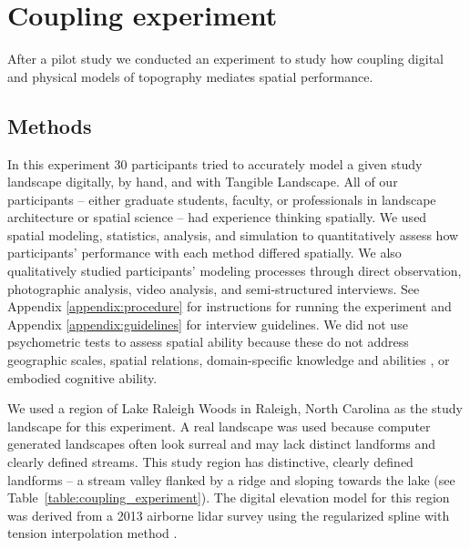 \documentclass[prodmode,acmtochi]{acmsmall} %
\begin{document}
\section{Coupling experiment}
After a pilot study \cite{Harmon2016b}
we conducted an experiment to study how 
coupling digital and physical models of topography 
mediates spatial performance. 

\subsection{Methods}
In this experiment 
30 participants tried to accurately model a given study landscape 
digitally, by hand, and with Tangible Landscape. 
%
All of our participants -- either graduate students, faculty, or professionals in landscape architecture or spatial science -- 
had experience thinking spatially. 
We used spatial modeling, statistics, analysis, and simulation to quantitatively assess how participants' performance with each method differed spatially. 
We also qualitatively studied participants' modeling processes through direct observation, photographic analysis, video analysis, and semi-structured interviews. 
See Appendix 
\ref{appendix:procedure} for instructions for running the experiment
and Appendix 
\ref{appendix:guidelines} for interview guidelines. 
%
We did not use psychometric tests
to assess spatial ability because
these do not address 
geographic scales,
spatial relations,
domain-specific knowledge and abilities 
\cite{Lee2009,Bednarz2011,Wakabayashi2011},
or embodied cognitive ability. 

We used a region of Lake Raleigh Woods in Raleigh, North Carolina 
as the study landscape for this experiment. 
A real landscape was used because computer generated landscapes 
often look surreal and may lack distinct landforms and clearly defined streams. 
This study region has distinctive, 
clearly defined landforms -- a stream valley flanked by a ridge and sloping towards the lake
(see Table~\ref{table:coupling_experiment}). 
The digital elevation model for this region was derived from a 2013 airborne lidar survey 
using the regularized spline with tension interpolation method \cite{Mitasova2005}. 
\end{document}

